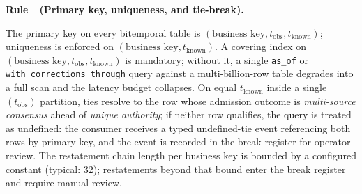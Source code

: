 \documentclass[11pt,a4paper]{article}
\newcounter{rul}
\newenvironment{rul}[1]{%
  \refstepcounter{rul}\par\medskip\noindent\textbf{Rule~\therul\ (#1).}\ %
}{\par\medskip}
\begin{document}
\begin{rul}{Primary key, uniqueness, and tie-break}
The primary key on every bitemporal table is $(\text{business\_key}, t_{\text{obs}}, t_{\text{known}})$; uniqueness is enforced on $(\text{business\_key}, t_{\text{known}})$. A covering index on $(\text{business\_key}, t_{\text{obs}}, t_{\text{known}})$ is mandatory; without it, a single \texttt{as\_of} or \texttt{with\_corrections\_through} query against a multi-billion-row table degrades into a full scan and the latency budget collapses. On equal $t_{\text{known}}$ inside a single $(t_{\text{obs}})$ partition, ties resolve to the row whose admission outcome is \emph{multi-source consensus} ahead of \emph{unique authority}; if neither row qualifies, the query is treated as undefined: the consumer receives a typed undefined-tie event referencing both rows by primary key, and the event is recorded in the break register for operator review. The restatement chain length per business key is bounded by a configured constant (typical: 32); restatements beyond that bound enter the break register and require manual review.
\end{rul}
\end{document}
